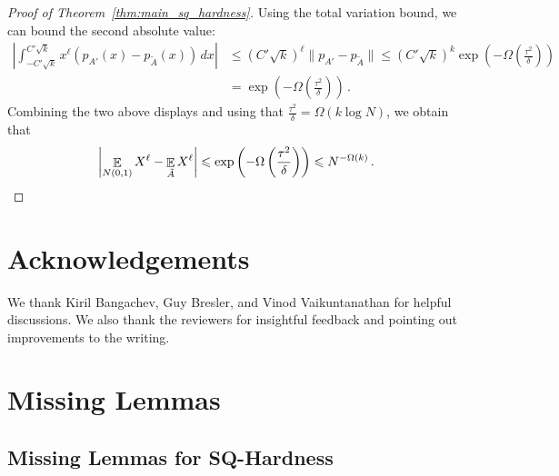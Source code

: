 \documentclass{theoretics}
\newcommand{\Paren}[1]{\left(#1\right)}
\newcommand{\Abs}[1]{\left\lvert#1\right\rvert}
\newcommand{\norm}[1]{\lVert#1\rVert}
\newcommand{\Esymb}{\mathbb{E}}
\DeclareMathOperator*{\E}{\Esymb}
\renewcommand{\leq}{\leqslant}
\begin{document}
\begin{proof}[Proof of Theorem~\ref{thm:main_sq_hardness}]
    Using the total variation bound, we can bound the second absolute value:
    \begin{align*}
        \Abs{\int_{-C'\sqrt{k}}^{C'\sqrt{k}} x^\ell (p_{A'}(x) - p_{\tilde{A}}(x)) \, dx} &\leq \Paren{C' \sqrt{k}}^\ell \norm{p_{A'} - p_{\tilde{A}}} \leq (C'\sqrt{k})^k\exp\Paren{- \Omega\Paren{\frac{\tau^2} \delta}} \\
        &= \exp\Paren{-\Omega\Paren{\frac {\tau^2} \delta}} \,.
    \end{align*}
    Combining the two above displays and using that $\tfrac {\tau^2} \delta = \Omega( k \log N)$, we obtain that
    \[
        \Abs{\E_{N(0,1)} X^\ell - \E_{\tilde{A}} X^\ell} \leq \exp\Paren{-\Omega\Paren{\frac {\tau^2} \delta}} \leq N^{-\Omega(k)} \,.\qedhere
    \]
\end{proof}

\section*{Acknowledgements}
We thank Kiril Bangachev, Guy Bresler, and Vinod Vaikuntanathan for helpful discussions.
We also thank the reviewers for insightful feedback and pointing out improvements to the writing.


%
%

\printbibliography

\newpage
\appendix


\section{Missing Lemmas}
\label{sec:missing_lemmas}

\subsection{Missing Lemmas for SQ-Hardness}
\label{sec:missing_lemmas_sq}
\end{document}
